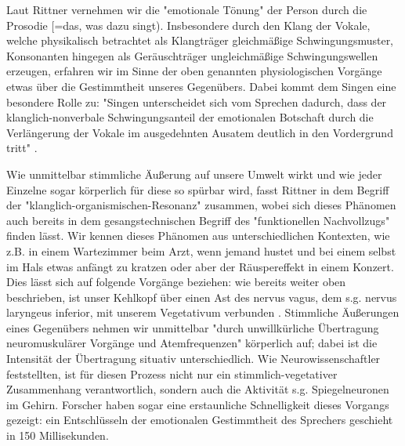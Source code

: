 Laut Rittner vernehmen wir die "emotionale Tönung" der Person durch die Prosodie [=das, was dazu singt). Insbesondere durch den Klang der Vokale, welche physikalisch betrachtet als Klangträger gleichmäßige Schwingungsmuster, Konsonanten hingegen als Geräuschträger ungleichmäßige Schwingungswellen erzeugen, erfahren wir im Sinne der oben genannten physiologischen Vorgänge etwas über die Gestimmtheit unseres Gegenübers. Dabei kommt dem Singen eine besondere Rolle zu: "Singen unterscheidet sich vom Sprechen dadurch, dass der klanglich-nonverbale Schwingungsanteil der emotionalen Botschaft durch die Verlängerung der Vokale im ausgedehnten Ausatem deutlich in den Vordergrund tritt" \autocite[205]{rittner2008}.

Wie unmittelbar stimmliche Äußerung auf unsere Umwelt wirkt und wie jeder Einzelne sogar körperlich für diese so spürbar wird, fasst Rittner in dem Begriff der "klanglich-organismischen-Resonanz" zusammen, wobei sich dieses Phänomen auch bereits in dem gesangstechnischen Begriff des "funktionellen Nachvollzugs" finden lässt. Wir kennen dieses Phänomen aus unterschiedlichen Kontexten, wie z.B. in einem Wartezimmer beim Arzt, wenn jemand hustet und bei einem selbst im Hals etwas anfängt zu kratzen oder aber der Räuspereffekt in einem Konzert. Dies lässt sich auf folgende Vorgänge beziehen: wie bereits weiter oben beschrieben, ist unser Kehlkopf über einen Ast des nervus vagus, dem s.g. nervus laryngeus inferior, mit unserem Vegetativum verbunden \autocite[vgl.][106]{rittner1990}. Stimmliche Äußerungen eines Gegenübers nehmen wir unmittelbar "durch unwillkürliche Übertragung neuromuskulärer Vorgänge und Atemfrequenzen" \autocite[482]{rittner2009a} körperlich auf; dabei ist die Intensität der Übertragung situativ unterschiedlich. Wie Neurowissenschaftler feststellten, ist für diesen Prozess nicht nur ein stimmlich-vegetativer Zusammenhang verantwortlich, sondern auch die Aktivität s.g. Spiegelneuronen im Gehirn. Forscher haben sogar eine erstaunliche Schnelligkeit dieses Vorgangs gezeigt: ein Entschlüsseln der emotionalen Gestimmtheit des Sprechers geschieht in 150 Millisekunden\autocite[vgl.][482]{rittner2009a}.


